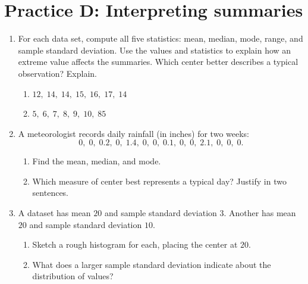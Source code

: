 \section*{Practice D: Interpreting summaries}
\begin{enumerate}[label=D\arabic*.,leftmargin=2.5em,itemsep=10pt]
  \item For each data set, compute all five statistics:
    mean, median, mode, range, and sample standard deviation.
    Use the values and statistics to explain how an extreme value affects the summaries. Which center better describes a typical observation? Explain.
    \begin{enumerate}[label=(\alph*), itemsep=6pt]
      \item $12,\; 14,\; 14,\; 15,\; 16,\; 17,\; 14$
      \item $5,\; 6,\; 7,\; 8,\; 9,\; 10,\; 85$
    \end{enumerate}

  \item A meteorologist records daily rainfall (in inches)
    for two weeks:
    \[ 0,\; 0,\; 0.2,\; 0,\; 1.4,\; 0,\; 0,\;
       0.1,\; 0,\; 0,\; 2.1,\; 0,\; 0,\; 0. \]
    \begin{enumerate}[label=(\alph*), itemsep=4pt]
      \item Find the mean, median, and mode.
      \item Which measure of center best represents a
        typical day?
        Justify in two sentences.
    \end{enumerate}

  \item A dataset has mean $20$ and sample standard deviation $3$.
    Another has mean $20$ and sample standard deviation $10$.
    \begin{enumerate}[label=(\alph*), itemsep=4pt]
      \item Sketch a rough histogram for each,
        placing the center at $20$.
      \item What does a larger sample standard deviation indicate
        about the distribution of values?
    \end{enumerate}

\end{enumerate}

\clearpage
